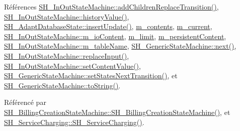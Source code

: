 Références \hyperlink{classSH__InOutStateMachine_ae0f3b4622d2c70884bb224dee86e95c0}{S\-H\-\_\-\-In\-Out\-State\-Machine\-::add\-Children\-Replace\-Transition()}, \hyperlink{classSH__InOutStateMachine_af71bfdb3b59b7bf2763588b513b4205f}{S\-H\-\_\-\-In\-Out\-State\-Machine\-::history\-Value()}, \hyperlink{classSH__AdaptDatabaseState_a037db544ea05f42d21fcbdda758839fe}{S\-H\-\_\-\-Adapt\-Database\-State\-::insert\-Update()}, \hyperlink{classSH__LoopingInOutStateMachine_a145e625dcb4d5438bd9c761eeb9425d4}{m\-\_\-contents}, \hyperlink{classSH__LoopingInOutStateMachine_af64f9f28a1b8e82bd9ee5f4b96a7c82e}{m\-\_\-current}, \hyperlink{classSH__InOutStateMachine_a8cfbc27eef057bf37b7711bdfef2077e}{S\-H\-\_\-\-In\-Out\-State\-Machine\-::m\-\_\-io\-Content}, \hyperlink{classSH__LoopingInOutStateMachine_a818a60d3691fcac11323ad114c309dcb}{m\-\_\-limit}, \hyperlink{classSH__LoopingInOutStateMachine_a4e9ea23cf1eecbe26c6ed93b290a9115}{m\-\_\-persistent\-Content}, \hyperlink{classSH__InOutStateMachine_aa009eecc5ab6181358faafb5996b6006}{S\-H\-\_\-\-In\-Out\-State\-Machine\-::m\-\_\-table\-Name}, \hyperlink{classSH__GenericStateMachine_af4771d31d87951c997fba1633c2d67f6}{S\-H\-\_\-\-Generic\-State\-Machine\-::next()}, \hyperlink{classSH__InOutStateMachine_a9fa5db44086de2576c812f631aa4f60a}{S\-H\-\_\-\-In\-Out\-State\-Machine\-::replace\-Input()}, \hyperlink{classSH__InOutStateMachine_a9ab1534306b2bdb62743d4bcefe40c17}{S\-H\-\_\-\-In\-Out\-State\-Machine\-::set\-Content\-Value()}, \hyperlink{classSH__GenericStateMachine_a136a71cd1f2de1322ac7694db25f0b53}{S\-H\-\_\-\-Generic\-State\-Machine\-::set\-States\-Next\-Transition()}, et \hyperlink{classSH__GenericStateMachine_a85c0c1c9d258ae991f84667412fa47cd}{S\-H\-\_\-\-Generic\-State\-Machine\-::to\-String()}.



Référencé par \hyperlink{classSH__BillingCreationStateMachine_ad62b77fa4aeafe200056ff3974562f83}{S\-H\-\_\-\-Billing\-Creation\-State\-Machine\-::\-S\-H\-\_\-\-Billing\-Creation\-State\-Machine()}, et \hyperlink{classSH__ServiceCharging_afa5273d046049b1c2b020a6a19a8290b}{S\-H\-\_\-\-Service\-Charging\-::\-S\-H\-\_\-\-Service\-Charging()}.


